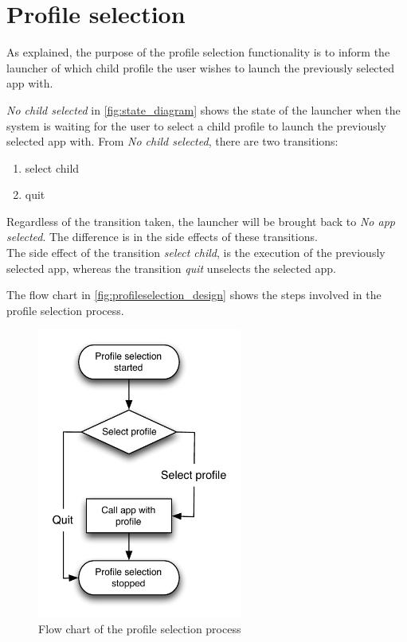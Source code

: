 \section{Profile selection}
\label{design:profile_selection}

As explained, the purpose of the profile selection functionality is to inform the launcher of which child profile the user wishes to launch the previously selected app with.

\emph{No child selected} in \autoref{fig:state_diagram} shows the state of the launcher when the system is waiting for the user to select a child profile to launch the previously selected app with.
From \emph{No child selected}, there are two transitions:

\begin{enumerate}
	\item select child
	\item quit
\end{enumerate}

\noindent Regardless of the transition taken, the launcher will be brought back to \emph{No app selected}.
The difference is in the side effects of these transitions. \\

\noindent The side effect of the transition \emph{select child}, is the execution of the previously selected app, whereas the transition \emph{quit} unselects the selected app.

The flow chart in \autoref{fig:profileselection_design} shows the steps involved in the profile selection process.

\label{design:profile_selection}
\begin{figure}[!h]
	\centering
	\includegraphics[width=0.6\textwidth]{gfx/profileselect_design.pdf}
	\caption{Flow chart of the profile selection process}
	\label{fig:profileselection_design}
\end{figure}

